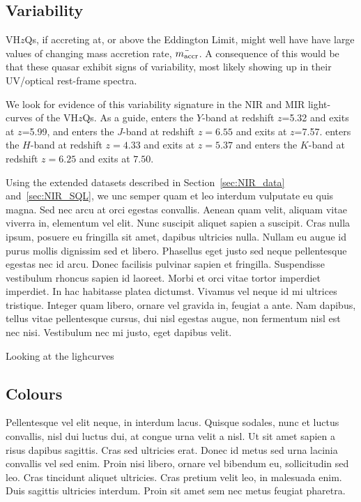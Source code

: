 \documentclass[usenatbib]{mnras}
\begin{document}
    \subsection{Variability}
    VH$z$Qs, if accreting at, or above the Eddington Limit, might well
    have have large values of changing mass accretion rate, $\ddot{m_{\rm
        accr}}$. A consequence of this would be that these quasar exhibit signs
    of variability, most likely showing up in their UV/optical rest-frame
    spectra.

    We look for evidence of this variability signature in the NIR and MIR light-curves of the VH$z$Qs. As a guide, \civ  enters the $Y$-band at redshift $z$=5.32 and exits at $z$=5.99, and enters the $J$-band at redshift $z=6.55$ and exits at $z$=7.57. \mgii enters the $H$-band at redshift  $z=4.33$ and exits at $z=5.37$ and enters the $K$-band at redshift  $z=6.25$ and exits at  $7.50$.  

    Using the extended datasets described in Section~\ref{sec:NIR_data} and~\ref{sec:NIR_SQL}, we unc semper quam et leo interdum vulputate eu quis magna. Sed nec arcu at orci egestas convallis. Aenean quam velit, aliquam vitae viverra in, elementum vel elit. Nunc suscipit aliquet sapien a suscipit. Cras nulla ipsum, posuere eu fringilla sit amet, dapibus ultricies nulla. Nullam eu augue id purus mollis dignissim sed et libero. Phasellus eget justo sed neque pellentesque egestas nec id arcu. Donec facilisis pulvinar sapien et fringilla. Suspendisse vestibulum rhoncus sapien id laoreet. Morbi et orci vitae tortor imperdiet imperdiet. In hac habitasse platea dictumst. Vivamus vel neque id mi ultrices tristique. Integer quam libero, ornare vel gravida in, feugiat a ante. Nam dapibus, tellus vitae pellentesque cursus, dui nisl egestas augue, non fermentum nisl est nec nisi. Vestibulum nec mi justo, eget dapibus velit.

   Looking at the lighcurves


\subsection{Colours}
Pellentesque vel elit neque, in interdum lacus. Quisque sodales, nunc et luctus convallis, nisl dui luctus dui, at congue urna velit a nisl. Ut sit amet sapien a risus dapibus sagittis. Cras sed ultricies erat. Donec id metus sed urna lacinia convallis vel sed enim. Proin nisi libero, ornare vel bibendum eu, sollicitudin sed leo. Cras tincidunt aliquet ultricies. Cras pretium velit leo, in malesuada enim. Duis sagittis ultricies interdum. Proin sit amet sem nec metus feugiat pharetra.
\end{document}
